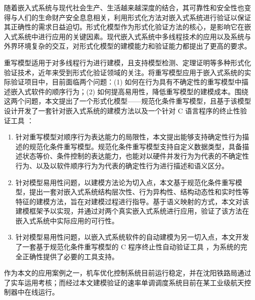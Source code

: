 \begin{cabstract}
随着嵌入式系统与现代社会生产、生活越来越深度的结合，其可靠性和安全性也变得与人们的生命财产安全息息相关，利用形式化方法对嵌入式系统进行验证以保证其正确性的需求日益迫切。形式化模型作为形式化验证方法的核心，是影响它在嵌入式系统中进行应用的关键因素。现代嵌入式系统中多线程技术的应用以及系统与外界环境复杂的交互，对形式化模型的建模能力和验证能力都提出了更高的要求。

重写模型适用于对多线程行为进行建模，且支持模型检测、定理证明等多种形式化验证技术，近年来受到形式化验证领域的关注。将重写模型应用于嵌入式系统的实际验证项目中，目前面临两个问题：(1) 如何在行为具有不确定性的重写模型中描述嵌入式软件的顺序行为；(2) 如何提高易用性，降低重写模型的建模成本。围绕这两个问题，本文提出了一个形式化模型——规范化条件重写模型，且基于该模型设计开发了一套针对嵌入式系统的建模方法以及一个针对 C 语言程序的终止性验证工具 \CTerm：

\begin{enumerate}
\item
针对重写模型对顺序行为表达能力的局限性，本文提出能够支持确定性行为描述的规范化条件重写模型。规范化条件重写模型支持自定义数据类型，具备描述状态等价、条件控制的表达能力，也能对以硬件并发行为为代表的不确定性行为、以及以软件顺序行为为代表的确定性行为进行描述和语义区分。
\item
针对模型易用性问题，以建模方法论为切入点，本文基于规范化条件重写模型，提出一套对嵌入式系统结构层次性、行为异构性、结构动态性和实时性等特征的建模方法，旨在对建模过程进行指导。基于语义映射的方式，本文对该建模框架予以实现，并通过对两个真实嵌入式系统进行应用，验证了该方法在嵌入式系统中实际应用的可行性。
\item 
针对模型易用性问题，以嵌入式系统软件的自动建模为另一切入点，本文开发了一套基于规范化条件重写模型的 C 程序终止性自动验证工具 \CTerm，为系统的完全正确性提供了必要的工具支持。
\end{enumerate}

作为本文的应用案例之一，机车优化控制系统目前运行稳定，并在沈阳铁路局通过了实车运用考核；而经过本文建模验证的速率单调调度系统目前在某工业级航天控制器中在线运行。
\end{cabstract}


